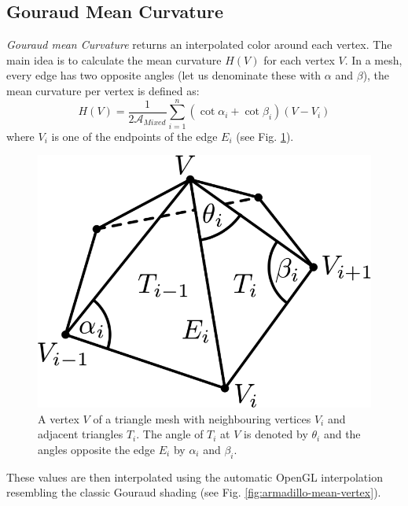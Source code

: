 \subsection{Gouraud Mean Curvature}
\textit{Gouraud mean Curvature} returns an interpolated color around each vertex. The main idea is to calculate the mean curvature $H(V)$ for each vertex $V$. In a mesh, every edge has two opposite angles (let us denominate these with $\alpha$ and $\beta$), the mean curvature per vertex is defined as:
$$H(V) = \frac{1}{2\mathcal{A}_{Mixed}} \sum_{i=1}^{n}(\cot \alpha_i + \cot \beta_i) (V - V_i)$$
where $V_i$ is one of the endpoints of the edge $E_i$ (see Fig. \ref{fig:mean-edge-cot}).
\begin{figure}[!h]
    \centering
    \includegraphics[scale=0.45]{images/mean-edge-cot.png}
    \caption{A vertex $V$ of a triangle mesh with neighbouring vertices $V_i$ and adjacent triangles $T_i$. The angle of $T_i$ at $V$ is denoted by $\theta_i$ and the angles opposite the edge $E_i$ by $\alpha_i$ and $\beta_i$. \cite{geometryprocessing}}\label{fig:mean-edge-cot}
\end{figure}

These values are then interpolated using the automatic OpenGL interpolation resembling the classic Gouraud shading (see Fig. \ref{fig:armadillo-mean-vertex}).

